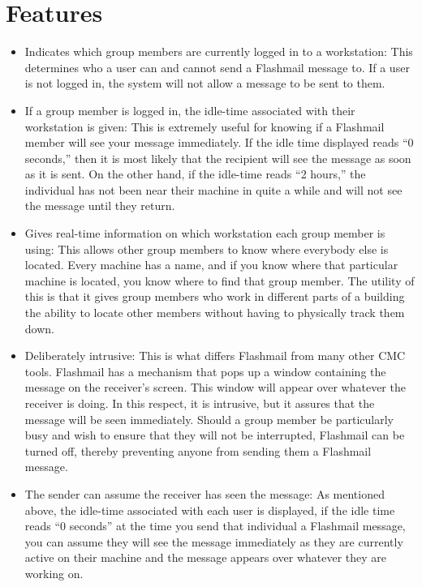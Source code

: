 \section{Features}
\begin{itemize}
\item Indicates which group members are currently logged in to a
  workstation: This determines who a user can and cannot send a Flashmail
  message to.  If a user is not logged in, the system will not allow a
  message to be sent to them.

\item If a group member is logged in, the idle-time associated with their
  workstation is given: This is extremely useful for knowing if a Flashmail
  member will see your message immediately.  If the idle time displayed
  reads ``0 seconds,'' then it is most likely that the recipient will see
  the message as soon as it is sent.  On the other hand, if the idle-time
  reads ``2 hours,'' the individual has not been near their machine in
  quite a while and will not see the message until they return.

\item Gives real-time information on which workstation each group member is
  using: This allows other group members to know where everybody else is
  located.  Every machine has a name, and if you know where that particular
  machine is located, you know where to find that group member.  The
  utility of this is that it gives group members who work in different
  parts of a building the ability to locate other members without having to
  physically track them down.

\item Deliberately intrusive: This is what differs Flashmail from many
  other CMC tools.  Flashmail has a mechanism that pops up a window
  containing the message on the receiver's screen.  This window will appear
  over whatever the receiver is doing.  In this respect, it is intrusive,
  but it assures that the message will be seen immediately.  Should a group
  member be particularly busy and wish to ensure that they will not be
  interrupted, Flashmail can be turned off, thereby preventing anyone from
  sending them a Flashmail message.

\item The sender can assume the receiver has seen the message: As mentioned
  above, the idle-time associated with each user is displayed, if the idle
  time reads ``0 seconds'' at the time you send that individual a Flashmail
  message, you can assume they will see the message immediately as they are
  currently active on their machine and the message appears over whatever
  they are working on.


\end{itemize}
